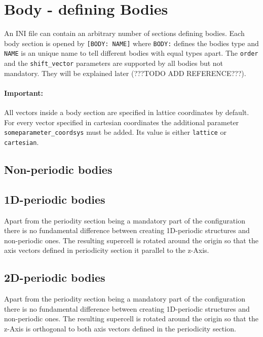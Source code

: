 \section{Body - defining Bodies}

An INI file can contain an arbitrary number of sections defining bodies. Each body section is opened by \lstinline{[BODY: NAME]} where \lstinline{BODY:} defines the bodies type and \lstinline{NAME} is an unique name to tell different bodies with equal types apart. The \lstinline{order} and the \lstinline{shift_vector} parameters are supported by all bodies but not mandatory. They will be explained later (???TODO ADD REFERENCE???).

\paragraph{Important:} All vectors inside a body section are specified in lattice coordinates by default. For every vector specified in cartesian coordinates the additional parameter \lstinline{someparameter_coordsys} must be added. Its value is either \lstinline{lattice} or \lstinline{cartesian}.

\subsection{Non-periodic bodies}


\subsection{1D-periodic bodies}

Apart from the periodity section being a mandatory part of the configuration there is no fundamental difference between creating 1D-periodic structures and non-periodic ones. The resulting supercell is rotated around the origin so that the axis vectors defined in periodicity section it parallel to the z-Axis.



\subsection{2D-periodic bodies}

Apart from the periodity section being a mandatory part of the configuration there is no fundamental difference between creating 1D-periodic structures and non-periodic ones. The resulting supercell is rotated around the origin so that the z-Axis is orthogonal to both axis vectors defined in the periodicity section.